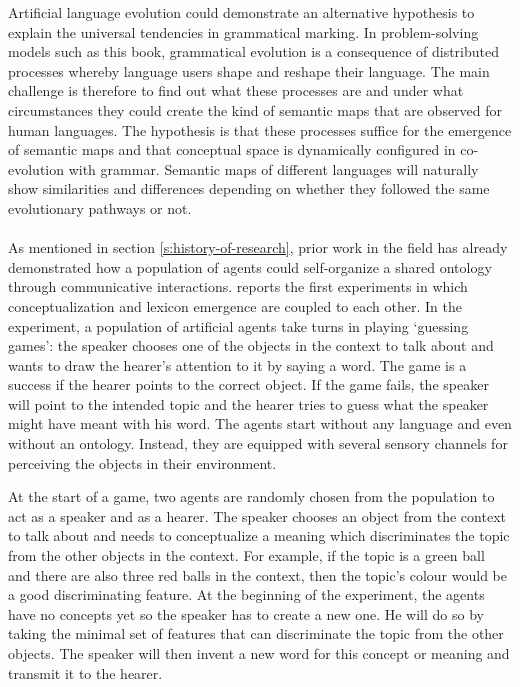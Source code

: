 Artificial language evolution could demonstrate an alternative hypothesis to explain the universal tendencies in grammatical marking. In problem-solving models such as this book, grammatical evolution is a consequence of distributed processes whereby language users shape and reshape their language. The main challenge is therefore to find out what these processes are and under what circumstances they could create the kind of semantic maps that are observed for human languages. The hypothesis is that these processes suffice for the emergence of semantic maps and that conceptual space is dynamically configured in co-evolution with grammar. Semantic maps of different languages will naturally show similarities and differences depending on whether they followed the same evolutionary pathways or not.
\\
\\
 As mentioned in section \ref{s:history-of-research}, prior work in the field has already demonstrated how a population of agents could self-organize a shared ontology through communicative interactions. \citet{steels97constructing} reports the first experiments in which conceptualization and lexicon emergence are coupled to each other. In the experiment, a population of artificial agents take turns in playing `guessing games': the speaker chooses one of the objects in the context to talk about and wants to draw the hearer's attention to it by saying a word. The game is a success if the hearer points to the correct object. If the game fails, the speaker will point to the intended topic and the hearer tries to guess what the speaker might have meant with his word. The agents start without any language and even without an ontology. Instead, they are equipped with several sensory channels for perceiving the objects in their environment.

At the start of a game, two agents are randomly chosen from the population to act as a speaker and as a hearer. The speaker chooses an object from the context to talk about and needs to conceptualize a meaning which discriminates the topic from the other objects in the context. For example, if the topic is a green ball and there are also three red balls in the context, then the topic's colour would be a good discriminating feature. At the beginning of the experiment, the agents have no concepts yet so the speaker has to create a new one. He will do so by taking the minimal set of features that can discriminate the topic from the other objects. The speaker will then invent a new word for this concept or meaning and transmit it to the hearer.


